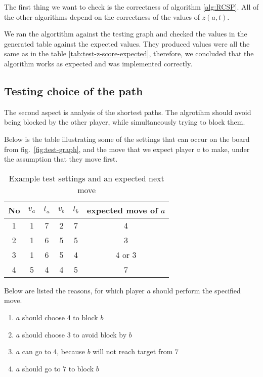 \documentclass[12pt]{article}
\begin{document}
The first thing we want to check is the correctness of algorithm \ref{alg:RCSP}.
All of the other algorithms depend on the correctness of the values of $z(a,t)$.

We ran the algortithm against the testing graph and checked the values in the generated table against the expected values.
They produced values were all the same as in the table \ref{tab:test-z-score-expected},
therefore, we concluded that the algorithm works as expected and was implemented correctly.

\subsection{Testing choice of the path}

The second aspect is analysis of the shortest paths.
The algrotihm should avoid being blocked by the other player,
while simultaneously trying to block them.

Below is the table illustrating some of the settings that can occur on the board from fig.~\ref{fig:test-graph},
and the move that we expect player $a$ to make, under the assumption that they move first.

\begin{table}[h]\centering
    \begin{tabular}{c|cccc|c}
        \toprule
        No & $v_a$ & $t_a$ & $v_b$ & $t_b$ & expected move of $a$ \\ \midrule
        1  & 1     & 7     & 2     & 7     & 4                    \\
        2  & 1     & 6     & 5     & 5     & 3                    \\
        3  & 1     & 6     & 5     & 4     & 4 or 3               \\
        4  & 5     & 4     & 4     & 5     & 7                    \\
        \bottomrule
    \end{tabular}
    \caption{Example test settings and an expected next move}
\end{table}

Below are listed the reasons, for which player $a$ should perform the specified move.
\begin{enumerate}
    \item $a$ should choose 4 to block $b$
    \item $a$ should choose 3 to avoid block by $b$
    \item $a$ can go to 4, because $b$ will not reach target from $7$
    \item $a$ should go to $7$ to block $b$
\end{enumerate}
\end{document}
